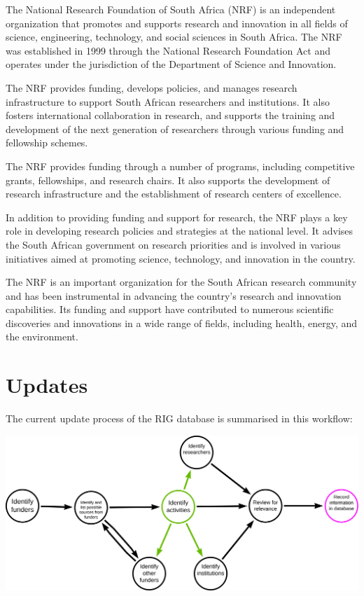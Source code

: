 \documentclass[
]{book}
\begin{document}
The National Research Foundation of South Africa (NRF) is an independent organization that promotes and supports research and innovation in all fields of science, engineering, technology, and social sciences in South Africa. The NRF was established in 1999 through the National Research Foundation Act and operates under the jurisdiction of the Department of Science and Innovation.

The NRF provides funding, develops policies, and manages research infrastructure to support South African researchers and institutions. It also fosters international collaboration in research, and supports the training and development of the next generation of researchers through various funding and fellowship schemes.

The NRF provides funding through a number of programs, including competitive grants, fellowships, and research chairs. It also supports the development of research infrastructure and the establishment of research centers of excellence.

In addition to providing funding and support for research, the NRF plays a key role in developing research policies and strategies at the national level. It advises the South African government on research priorities and is involved in various initiatives aimed at promoting science, technology, and innovation in the country.

The NRF is an important organization for the South African research community and has been instrumental in advancing the country's research and innovation capabilities. Its funding and support have contributed to numerous scientific discoveries and innovations in a wide range of fields, including health, energy, and the environment.

\hypertarget{updates}{%
\chapter{Updates}\label{updates}}

The current update process of the RIG database is summarised in this workflow:

\includegraphics{images/initial-acdc-db-search_NK.png}
\end{document}

